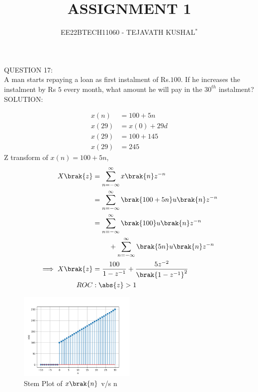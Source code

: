 \documentclass[journal,12pt,twocolumn]{IEEEtran}
\theoremstyle{remark}
\begin{document}

\vspace{3cm}

\title{ASSIGNMENT 1}
\author{EE22BTECH11060 - TEJAVATH KUSHAL$^{*}$%
}
\maketitle
\newpage
\bigskip

\renewcommand{\thefigure}{\theenumi}
\renewcommand{\thetable}{\theenumi}


\maketitle
QUESTION 17:\\
A man starts repaying a loan as first instalment of Rs.$100$. If he increases the
instalment by Rs $5$ every month, what amount he will pay in the $30^{th}$ instalment?\\

SOLUTION:\\
\fi
\begin{table}[ht]

\end{table}

\begin{align}
x(n)&= 100 + 5n \\
x(29)&= x(0)+29d \\
x(29)&= 100+ 145 \\
x(29)&= 245
\end{align}
Z transform of $x(n)= 100 + 5n$,
\begin{align}
X \brak{z} & = \sum_{n=-\infty}^{\infty} x \brak{n}   z^{-n} \\
& = \sum_{n=-\infty}^{\infty}  \brak{100+5n} u \brak{n}   z^{-n} \\
\notag & = \sum_{n=-\infty}^{\infty} \brak{100} u \brak{n}   z^{-n} \\  &~~~~~~~+\sum_{n=-\infty}^{\infty} \brak{5n} u \brak{n}  z^{-n} \\
\implies X \brak{z} & = \frac{100}{1-z^{-1}} + \frac{5z^{-2}}{\brak{1-z^{-1}}^2} \\
ROC &: \abs{z} > 1 \notag
\end{align}


\pagebreak

\begin{figure}[h]
    \includegraphics[width=0.5\textwidth]{ncert-maths/11/9/2/17/figs/x(n)_vs_n.png}
    \caption{Stem Plot of $x\brak{n}$ v/s n}
\end{figure}
\end{document}
